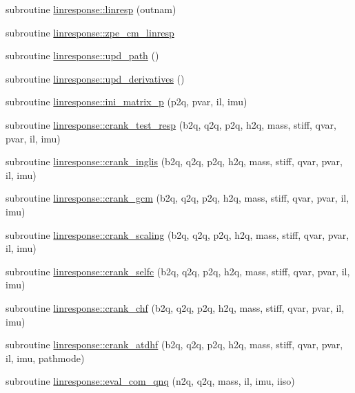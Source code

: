 \begin{DoxyCompactItemize}
\item 
subroutine \hyperlink{namespacelinresponse_ac7dc729b94ff97324cbcb373a7053824}{linresponse\+::linresp} (outnam)
\item 
subroutine \hyperlink{namespacelinresponse_aab3668ccec9e4ea33e562dab64df6ea7}{linresponse\+::zpe\+\_\+cm\+\_\+linresp}
\item 
subroutine \hyperlink{namespacelinresponse_accf4858777e66315385254729a6171a9}{linresponse\+::upd\+\_\+path} ()
\item 
subroutine \hyperlink{namespacelinresponse_a50077a49a59d82124945f738cc437277}{linresponse\+::upd\+\_\+derivatives} ()
\item 
subroutine \hyperlink{namespacelinresponse_ab65d39013d00e2cd1de48c1b00346e75}{linresponse\+::ini\+\_\+matrix\+\_\+p} (p2q, pvar, il, imu)
\item 
subroutine \hyperlink{namespacelinresponse_a95312b973b472d59dc5295754cc55d9a}{linresponse\+::crank\+\_\+test\+\_\+resp} (b2q, q2q, p2q, h2q, mass, stiff, qvar, pvar, il, imu)
\item 
subroutine \hyperlink{namespacelinresponse_a777faa79d49267e9d5ace6baa9b61b23}{linresponse\+::crank\+\_\+inglis} (b2q, q2q, p2q, h2q, mass, stiff, qvar, pvar, il, imu)
\item 
subroutine \hyperlink{namespacelinresponse_a9f43d9ba17b599e367e32c1a116cf9ee}{linresponse\+::crank\+\_\+gcm} (b2q, q2q, p2q, h2q, mass, stiff, qvar, pvar, il, imu)
\item 
subroutine \hyperlink{namespacelinresponse_ab848da5b377f9ae7a08bafb5dd17639e}{linresponse\+::crank\+\_\+scaling} (b2q, q2q, p2q, h2q, mass, stiff, qvar, pvar, il, imu)
\item 
subroutine \hyperlink{namespacelinresponse_a036dc4cb7a96c3c1e325f114354d0b45}{linresponse\+::crank\+\_\+selfc} (b2q, q2q, p2q, h2q, mass, stiff, qvar, pvar, il, imu)
\item 
subroutine \hyperlink{namespacelinresponse_ad6ff2cb4832bf0daf8777d1f4018fd23}{linresponse\+::crank\+\_\+chf} (b2q, q2q, p2q, h2q, mass, stiff, qvar, pvar, il, imu)
\item 
subroutine \hyperlink{namespacelinresponse_a617bf806d780675484099cc4305c0d6c}{linresponse\+::crank\+\_\+atdhf} (b2q, q2q, p2q, h2q, mass, stiff, qvar, pvar, il, imu, pathmode)
\item 
subroutine \hyperlink{namespacelinresponse_a4c1e86b5926885714434e0012651a467}{linresponse\+::eval\+\_\+com\+\_\+qnq} (n2q, q2q, mass, il, imu, iiso)

\end{DoxyCompactItemize}
